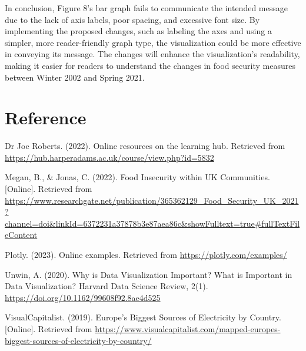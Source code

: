 \documentclass[
]{article}
\begin{document}
In conclusion, Figure 8's bar graph fails to communicate the intended
message due to the lack of axis labels, poor spacing, and excessive font
size. By implementing the proposed changes, such as labeling the axes
and using a simpler, more reader-friendly graph type, the visualization
could be more effective in conveying its message. The changes will
enhance the visualization's readability, making it easier for readers to
understand the changes in food security measures between Winter 2002 and
Spring 2021.

\newpage

\hypertarget{reference}{%
\section{Reference}\label{reference}}

Dr Joe Roberts. (2022). Online resources on the learning hub. Retrieved
from \url{https://hub.harperadams.ac.uk/course/view.php?id=5832}

Megan, B., \& Jonas, C. (2022). Food Insecurity within UK Communities.
{[}Online{]}. Retrieved from
\url{https://www.researchgate.net/publication/365362129_Food_Security_UK_2021?channel=doi\&linkId=6372231a37878b3e87aea86c\&showFulltext=true\#fullTextFileContent}

Plotly. (2023). Online examples. Retrieved from
\url{https://plotly.com/examples/}

Unwin, A. (2020). Why is Data Visualization Important? What is Important
in Data Visualization? Harvard Data Science Review, 2(1).
\url{https://doi.org/10.1162/99608f92.8ae4d525}

VisualCapitalist. (2019). Europe's Biggest Sources of Electricity by
Country. {[}Online{]}. Retrieved from
\url{https://www.visualcapitalist.com/mapped-europes-biggest-sources-of-electricity-by-country/}
\end{document}
